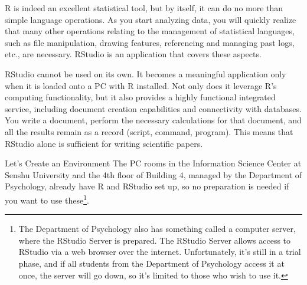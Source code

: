 \documentclass{ltjsbook}
\begin{document}
R is indeed an excellent statistical tool, but by itself, it can do no more than simple language operations. As you start analyzing data, you will quickly realize that many other operations relating to the management of statistical languages, such as file manipulation, drawing features, referencing and managing past logs, etc., are necessary. RStudio is an application that covers these aspects.

RStudio cannot be used on its own. It becomes a meaningful application only when it is loaded onto a PC with R installed. Not only does it leverage R's computing functionality, but it also provides a highly functional integrated service, including document creation capabilities and connectivity with databases. You write a document, perform the necessary calculations for that document, and all the results remain as a record (script, command, program). This means that RStudio alone is sufficient for writing scientific papers.


Let's Create an Environment
The PC rooms in the Information Science Center at Senshu University and the 4th floor of Building 4, managed by the Department of Psychology, already have R and RStudio set up, so no preparation is needed if you want to use these\footnote{The Department of Psychology also has something called a computer server, where the RStudio Server is prepared. The RStudio Server allows access to RStudio via a web browser over the internet. Unfortunately, it's still in a trial phase, and if all students from the Department of Psychology access it at once, the server will go down, so it's limited to those who wish to use it.}.
\end{document}

